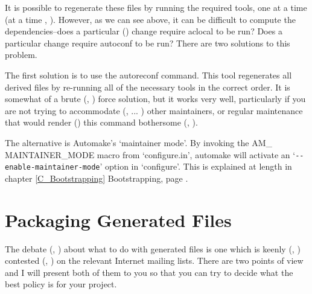 It is possible to regenerate these files by running the required tools,
one at a time (at a time {\MbQ{}}, {\McQ{}}). However, as we can see above, it can be difficult to compute the dependencies--does a particular ({\MbQ{}}) change require aclocal to be run? Does a particular change require autoconf to be run? There are two solutions to this problem. 


The first solution is to use the autoreconf command. This tool regenerates all derived files by re-running all of the necessary tools in the correct order. It is somewhat of a brute ({\MhQ{}}, {\MbQ{}}) force solution, but it works very 
well, particularly if you are not trying to accommodate ({\McQ{}}, {\MaQ{}}... {\MbQ{}})
other maintainers, or regular maintenance that would render ({\MaQ{}})
this command bothersome ({\MaQ{}}, {\MkQ{}}). 


The alternative is Automake's `maintainer mode'.
By invoking the AM\_{}
MAINTAINER\_{}MODE macro from `configure.in',
automake will activate an `\verb+--enable-maintainer-mode+' option 
in `configure'.
This is explained at length in chapter \ref{C_Bootstrapping} Bootstrapping,
page \pageref{C_Bootstrapping}. 

\section{Packaging Generated Files}


The debate ({\McQ{}}, {\MjQ{}}) about what to do with generated files is one which is 
keenly ({\MfQ{}}, {\MbQ{}}) contested ({\MhQ{}}, {\MbQ{}}) on the relevant Internet 
mailing lists. There are two points
of view and I will present both of them to you so that you can try 
to decide what the best policy is for your project. 


